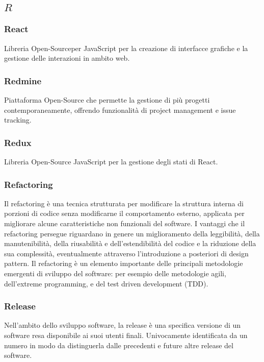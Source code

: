 \subsection*{\quad$R\quad$}

\subsubsection*{React}
Libreria Open-Source\glosp per JavaScript per la creazione di interfacce grafiche e la gestione delle interazioni in ambito web.

\subsubsection*{Redmine}
Piattaforma Open-Source che permette la gestione di più progetti contemporaneamente, offrendo funzionalità di project management e issue tracking.

\subsubsection*{Redux}
Libreria Open-Source JavaScript per la gestione degli stati di React\glo.

\subsubsection*{Refactoring}
Il refactoring è una tecnica strutturata per modificare la struttura interna di porzioni di codice senza modificarne il comportamento esterno, applicata per migliorare alcune caratteristiche non funzionali del software. I vantaggi che il refactoring persegue riguardano in genere un miglioramento della leggibilità, della manutenibilità, della riusabilità e dell'estendibilità del codice e la riduzione della sua complessità, eventualmente attraverso l'introduzione a posteriori di design pattern. Il refactoring è un elemento importante delle principali metodologie emergenti di sviluppo del software: per esempio delle metodologie agili, dell'extreme programming, e del test driven development (TDD).

\subsubsection*{Release}
Nell'ambito dello sviluppo software, la release è una specifica versione di un software resa disponibile ai suoi utenti finali. Univocamente identificata da un numero in modo da distinguerla dalle precedenti e future altre release del software.

